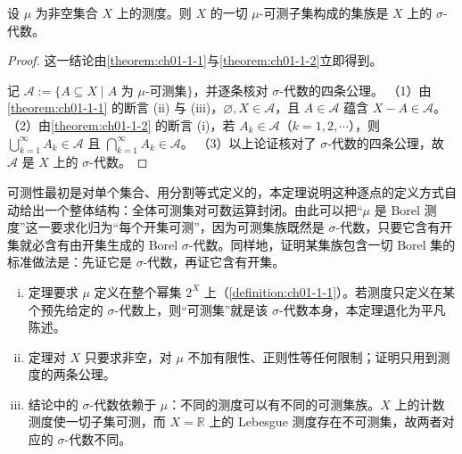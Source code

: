 \documentclass[../../main.tex]{subfiles}
\begin{document}
\begin{theorem}\label{theorem:ch01-1-3}
设 $\mu$ 为非空集合 $X$ 上的测度。则 $X$ 的一切 $\mu$-可测子集构成的集族是 $X$ 上的 $\sigma$-代数。
\end{theorem}

\begin{proof}
这一结论由\cref{theorem:ch01-1-1}与\cref{theorem:ch01-1-2}立即得到。%

记 $\mathcal{A}:=\{A\subseteq X\mid A\text{ 为 }\mu\text{-可测集}\}$，并逐条核对 $\sigma$-代数的四条公理。
（1）由\cref{theorem:ch01-1-1} 的断言 (ii) 与 (iii)，$\varnothing,X\in\mathcal{A}$，且 $A\in\mathcal{A}$ 蕴含 $X-A\in\mathcal{A}$。%
（2）由\cref{theorem:ch01-1-2} 的断言 (i)，若 $A_{k}\in\mathcal{A}$（$k=1,2,\cdots$），则 $\bigcup_{k=1}^{\infty}A_{k}\in\mathcal{A}$ 且 $\bigcap_{k=1}^{\infty}A_{k}\in\mathcal{A}$。%
（3）以上论证核对了 $\sigma$-代数的四条公理，故 $\mathcal{A}$ 是 $X$ 上的 $\sigma$-代数。
\end{proof}

\begin{remark}\label{remark:ch01-thm-1-3-动机}
可测性最初是对单个集合、用分割等式定义的，本定理说明这种逐点的定义方式自动给出一个整体结构：全体可测集对可数运算封闭。由此可以把“$\mu$ 是 Borel 测度”这一要求化归为“每个开集可测”，因为可测集族既然是 $\sigma$-代数，只要它含有开集就必含有由开集生成的 Borel $\sigma$-代数。同样地，证明某集族包含一切 Borel 集的标准做法是：先证它是 $\sigma$-代数，再证它含有开集。
\end{remark}

\begin{remark}\label{remark:ch01-thm-1-3-条件}
\begin{enumerate}[(i)]
\item 定理要求 $\mu$ 定义在整个幂集 $2^{X}$ 上（\cref{definition:ch01-1-1}）。若测度只定义在某个预先给定的 $\sigma$-代数上，则“可测集”就是该 $\sigma$-代数本身，本定理退化为平凡陈述。%
\item 定理对 $X$ 只要求非空，对 $\mu$ 不加有限性、正则性等任何限制；证明只用到测度的两条公理。
\item 结论中的 $\sigma$-代数依赖于 $\mu$：不同的测度可以有不同的可测集族。$X$ 上的计数测度使一切子集可测，而 $X=\mathbb{R}$ 上的 Lebesgue 测度存在不可测集，故两者对应的 $\sigma$-代数不同。
\end{enumerate}
\end{remark}
\end{document}
